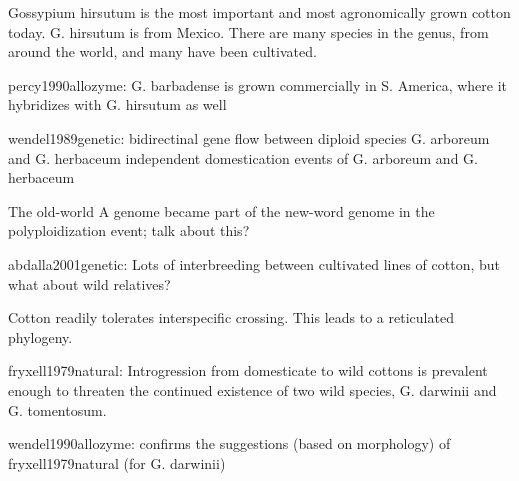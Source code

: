 \documentclass[11pt]{article}
\begin{document}
Gossypium hirsutum is the most important and most agronomically grown cotton today.
G. hirsutum is from Mexico.
There are many species in the genus, from around the world, and many have been cultivated.

percy1990allozyme:
G. barbadense is grown commercially in S. America, where it hybridizes with G. hirsutum as well

wendel1989genetic:
bidirectinal gene flow between diploid species G. arboreum and G. herbaceum
independent domestication events of G. arboreum and G. herbaceum

The old-world A genome became part of the new-word genome in the polyploidization event; talk about this?

abdalla2001genetic:
Lots of interbreeding between cultivated lines of cotton, but what about wild relatives?

Cotton readily tolerates interspecific crossing.
This leads to a reticulated phylogeny.

fryxell1979natural:
Introgression from domesticate to wild cottons is prevalent enough to threaten the continued existence of two wild species, G. darwinii and G. tomentosum.

wendel1990allozyme:
confirms the suggestions (based on morphology) of fryxell1979natural (for G. darwinii)











\end{document}
